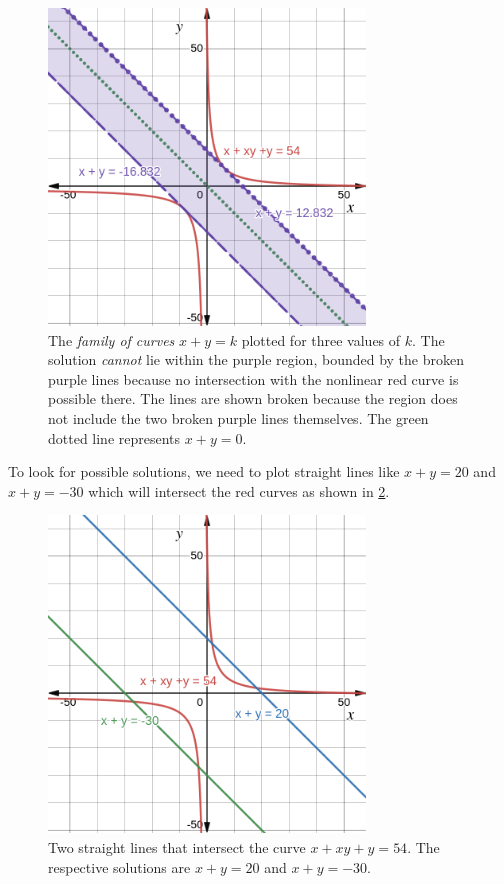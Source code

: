 \documentclass[
  a4paper,
]{article}
\begin{document}
\begin{figure}
\hypertarget{fig:two}{%
\centering
\includegraphics[width=0.75\textwidth,height=\textheight]{images/olympiad-two.png}
\caption{The \emph{family of curves} \(x + y = k\) plotted for three
values of \(k\). The solution \emph{cannot} lie within the purple
region, bounded by the broken purple lines because no intersection with
the nonlinear red curve is possible there. The lines are shown broken
because the region does not include the two broken purple lines
themselves. The green dotted line represents
\(x + y = 0\).}\label{fig:two}
}
\end{figure}

To look for possible solutions, we need to plot straight lines like
\(x + y = 20\) and \(x + y = -30\) which will intersect the red curves
as shown in \cref{fig:three}.

\begin{figure}
\hypertarget{fig:three}{%
\centering
\includegraphics[width=0.75\textwidth,height=\textheight]{images/olympiad-three.png}
\caption{Two straight lines that intersect the curve
\(x + xy + y = 54\). The respective solutions are \(x + y = 20\) and
\(x + y = -30\).}\label{fig:three}
}
\end{figure}
\end{document}

